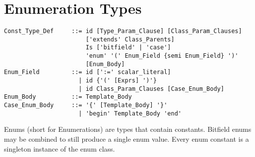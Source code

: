 \section{Enumeration Types}
\label{sec:enums}

\syntax\begin{lstlisting}
Const_Type_Def     ::= id [Type_Param_Clause] [Class_Param_Clauses]
                       ['extends' Class_Parents] 
                       Is ['bitfield' | 'case'] 
                       'enum' '(' Enum_Field {semi Enum_Field} ')'
                       [Enum_Body]
Enum_Field         ::= id [':=' scalar_literal]
                     | id {'(' [Exprs] ')'}
                     | id Class_Param_Clauses [Case_Enum_Body]
Enum_Body          ::= Template_Body
Case_Enum_Body     ::= '{' [Template_Body] '}'
                     | 'begin' Template_Body 'end'
\end{lstlisting}

Enums (short for Enumerations) are types that contain constants. Bitfield enums may be combined to still produce a single enum value. Every enum constant is a singleton instance of the enum class. 

